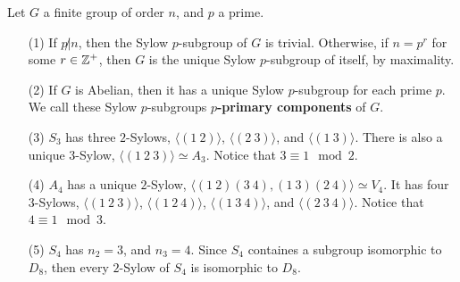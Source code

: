 \begin{example}\label{4.12}
    Let $G$ a finite group of order $n$, and  $p$ a prime.
    \begin{enumerate}
        \item[(1)] If $p \not| n$, then the Sylow $p$-subgroup of $G$ is
            trivial. Otherwise, if  $n=p^r$ for some  $r \in \mathbb{Z}^+$, then $G$ is
            the unique Sylow $p$-subgroup of itself, by maximality.

        \item[(2)] If $G$ is Abelian, then it has a unique Sylow $p$-subgroup
            for each prime $p$. We call these Sylow $p$-subgroups
            \textbf{$p$-primary components} of $G$.

        \item[(3)] $S_3$ has three $2$-Sylows, $\langle (1 \ 2) \rangle$,
            $\langle (2 \ 3) \rangle$, and  $\langle (1 \ 3) \rangle$. There is
            also a unique $3$-Sylow,  $\langle (1 \ 2 \ 3) \rangle \simeq A_3$.
            Notice that $3 \equiv 1 \mod{2}$.

        \item[(4)] $A_4$ has a unique $2$-Sylow,  $\langle (1 \ 2)(3 \ 4),
            (1 \ 3)(2 \ 4) \rangle \simeq V_4$. It has four $3$-Sylows,
            $\langle (1 \ 2 \ 3) \rangle$, $\langle (1 \ 2 \ 4) \rangle$, $\langle
            (1 \ 3 \ 4) \rangle$, and $\langle (2 \ 3 \ 4) \rangle$. Notice that
             $4 \equiv 1 \mod{3}$.

         \item[(5)] $S_4$ has $n_2=3$, and  $n_3=4$. Since $S_4$ containes a
             subgroup isomorphic to $D_8$, then every $2$-Sylow of $S_4$ is
             isomorphic to $D_8$.
    \end{enumerate}
\end{example}
